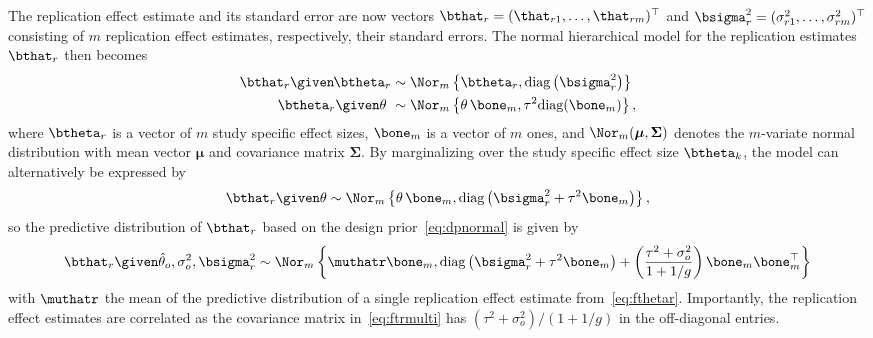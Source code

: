 The replication effect estimate and its standard error are now vectors
$\bthat_{r} = (\that_{r1}, \dots, \that_{rm})^{\top}$ and
$\bsigma^{2}_{r} = (\sigma^{2}_{r1}, \dots, \sigma^{2}_{rm})^{\top}$ consisting
of $m$ replication effect estimates, respectively, their standard errors. The
normal hierarchical model for the replication estimates $\bthat_{r}$ then
becomes
\begin{subequations}
\label{eq:hierarch-model2}
\begin{align}
  \bthat_r \given \mspace{-1mu} \btheta_r &\sim \Nor_{m}\left\{\btheta_r, \text{diag}\left(\bsigma_r^2\right)\right\}
  \label{eq:hat_theta_k22} \\
  \btheta_r \given \theta \,\,  &\sim \Nor_{m}\left\{\theta \, \bone_{m},
  \tau^2 \text{diag}(\bone_{m})\right\}, \label{eq:theta_k2}
\end{align}
\end{subequations}
where $\btheta_{r}$ is a vector of $m$ study specific effect sizes, $\bone_{m}$
is a vector of $m$ ones, and $\Nor_{m}(\boldsymbol{\mu}, \boldsymbol{\Sigma})$
denotes the $m$-variate normal distribution with mean vector $\boldsymbol{\mu}$
and covariance matrix $\boldsymbol{\Sigma}$. By marginalizing over the study
specific effect size $\btheta_{k}$, the model can alternatively be expressed by
\begin{align}
  \bthat_r \given \theta \sim \Nor_{m}\left\{\theta \, \bone_{m},
\text{diag}\left(\bsigma_r^2 + \tau^2 \bone_{m}\right)\right\},
  \label{eq:margimulti}
\end{align}
so the predictive distribution of $\bthat_r$ based on the design
prior~\eqref{eq:dpnormal} is given by
\begin{align}
  \bthat_r \given \hat{\theta}_o, \sigma^{2}_{o}, \bsigma^{2}_{r}
  \sim \Nor_{m}\left\{\muthatr \bone_{m},
  \text{diag}\left(\bsigma_r^2 + \tau^2 \bone_{m}\right) +
  \left(\frac{\tau^{2} + \sigma^{2}_{o}}{1 + 1/g}\right)
  \bone_{m} \bone_{m}^{\top} \right\}
  \label{eq:ftrmulti}
\end{align}
with $ \muthatr$ the mean of the predictive distribution of a single replication
effect estimate from~\eqref{eq:fthetar}. Importantly, the replication effect
estimates are correlated as the covariance matrix in~\eqref{eq:ftrmulti} has
$(\tau^2+\sigma^{2}_{o})/(1 + 1/g)$ in the off-diagonal entries.

